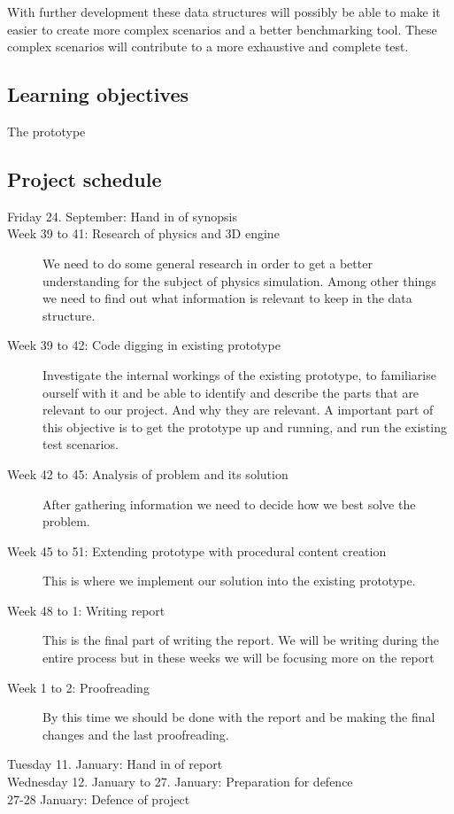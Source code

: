 \documentclass[a4paper, 10pt]{article}
\begin{document}
With further development these data structures will possibly be able to make it easier to create more complex scenarios
and a better benchmarking tool. These complex scenarios will contribute to a more exhaustive and complete test.
\subsection*{Learning objectives}
\begin{description}
\item[The prototype] 
\end{description}
\subsection*{Project schedule}
\begin{description}
\item[Friday 24. September: Hand in of synopsis]
\item[Week 39 to 41: Research of physics and 3D engine] We need to do some general research in order to get a better
understanding for the subject of physics simulation. Among other things we need to find out what information is relevant to keep in the
data structure.
\item[Week 39 to 42: Code digging in existing prototype]
Investigate the internal workings of the existing prototype, to familiarise ourself with it and be able to identify and describe 
the parts that are relevant to our project. And why they are relevant.
A important part of this objective is to get the prototype up and running, and run the existing test scenarios.
\item[Week 42 to 45: Analysis of problem and its solution]
After gathering information we need to decide how we best solve the problem.
\item[Week 45 to 51: Extending prototype with procedural content creation] This is where we implement our solution into
the existing prototype.
\item[Week 48 to 1: Writing report]
This is the final part of writing the report. We will be writing during the entire process but in these weeks we will be
focusing more on the report
\item[Week 1 to 2:  Proofreading]
By this time we should be done with the report and be making the final changes and the last proofreading.
\item[Tuesday 11. January: Hand in of report]
\item[Wednesday 12. January to 27. January: Preparation for defence]
\item[27-28 January: Defence of project]
\end{description}
\end{document}
